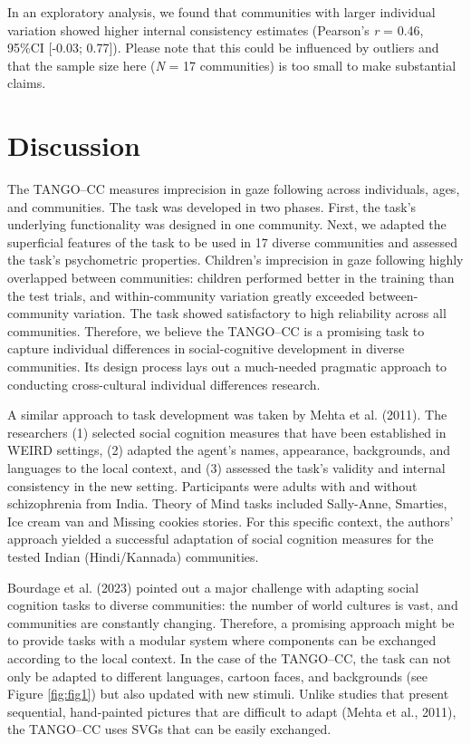 \documentclass[
  man,floatsintext]{apa7}
\begin{document}
In an exploratory analysis, we found that communities with larger individual variation showed higher internal consistency estimates (Pearson's \emph{r} = 0.46, 95\%CI {[}-0.03; 0.77{]}).
Please note that this could be influenced by outliers and that the sample size here (\emph{N} = 17 communities) is too small to make substantial claims.

\section{Discussion}\label{discussion}

The TANGO--CC measures imprecision in gaze following across individuals, ages, and communities.
The task was developed in two phases.
First, the task's underlying functionality was designed in one community.
Next, we adapted the superficial features of the task to be used in 17 diverse communities and assessed the task's psychometric properties.
Children's imprecision in gaze following highly overlapped between communities: children performed better in the training than the test trials, and within-community variation greatly exceeded between-community variation.
The task showed satisfactory to high reliability across all communities.
Therefore, we believe the TANGO--CC is a promising task to capture individual differences in social-cognitive development in diverse communities.
Its design process lays out a much-needed pragmatic approach to conducting cross-cultural individual differences research.

A similar approach to task development was taken by Mehta et al. (2011).
The researchers (1) selected social cognition measures that have been established in WEIRD settings, (2) adapted the agent's names, appearance, backgrounds, and languages to the local context, and (3) assessed the task's validity and internal consistency in the new setting.
Participants were adults with and without schizophrenia from India. Theory of Mind tasks included Sally-Anne, Smarties, Ice cream van and Missing cookies stories.
For this specific context, the authors' approach yielded a successful adaptation of social cognition measures for the tested Indian (Hindi/Kannada) communities.

Bourdage et al. (2023) pointed out a major challenge with adapting social cognition tasks to diverse communities: the number of world cultures is vast, and communities are constantly changing.
Therefore, a promising approach might be to provide tasks with a modular system where components can be exchanged according to the local context.
In the case of the TANGO--CC, the task can not only be adapted to different languages, cartoon faces, and backgrounds (see Figure \ref{fig:fig1}) but also updated with new stimuli.
Unlike studies that present sequential, hand-painted pictures that are difficult to adapt (Mehta et al., 2011), the TANGO--CC uses SVGs that can be easily exchanged.
\end{document}
